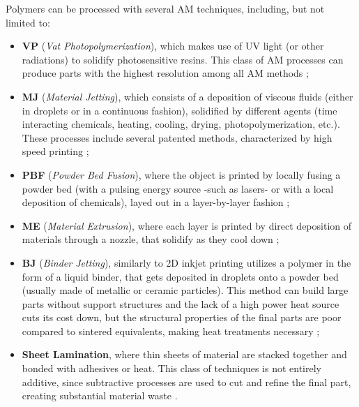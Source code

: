 \documentclass{article}
\begin{document}
    Polymers can be processed with several AM techniques, including, but not limited to: 

    \begin{itemize}
        \item \textbf{VP} (\textit{Vat Photopolymerization}), which makes use of UV light (or other radiations) to solidify photosensitive resins. This class of AM processes can produce 
                        parts with the highest resolution among all AM methods \autocites*{Recent_progress_polymers_AM}{Kovalcik_PHA_Review};
        \item \textbf{MJ} (\textit{Material Jetting}), which consists of a deposition of viscous fluids (either in droplets or in a continuous fashion), solidified by different agents 
                            (time interacting chemicals, heating, cooling, drying, photopolymerization, etc.). These processes include several patented methods, characterized by 
                            high speed printing \autocite*{Recent_progress_polymers_AM};
        \item \textbf{PBF} (\textit{Powder Bed Fusion}), where the object is printed by locally fusing a powder bed (with a pulsing energy source -such as lasers- or with a local deposition of chemicals),
                            layed out in a layer-by-layer fashion \autocites*{Recent_progress_polymers_AM}{Kovalcik_PHA_Review};
        \item \textbf{ME} (\textit{Material Extrusion}), where each layer is printed by direct deposition of materials through a nozzle, that solidify as they cool down \autocites*{Recent_progress_polymers_AM}{Kovalcik_PHA_Review};
        \item \textbf{BJ} (\textit{Binder Jetting}), similarly to 2D inkjet printing utilizes a
                        polymer in the form of a liquid binder, that gets deposited in droplets onto a powder bed (usually made of metallic or ceramic particles). This 
                        method can build large parts without support structures and the lack of a high power heat source cuts its cost down, but the structural 
                        properties of the final parts are poor compared to sintered equivalents, making heat treatments necessary \autocite*{Recent_progress_polymers_AM};
        \item \textbf{Sheet Lamination}, where thin sheets of material are stacked together and bonded with adhesives or heat. This class of techniques 
                        is not entirely additive, since subtractive processes are used to cut and refine the final part, creating substantial material waste \autocite*{Recent_progress_polymers_AM}.
    \end{itemize} \clearpage
\end{document}
